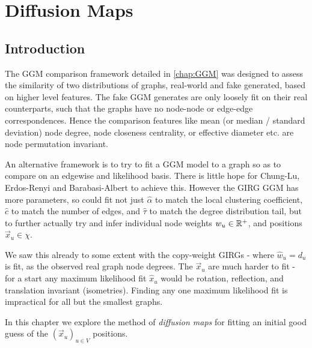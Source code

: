 \chapter{Diffusion Maps}
\label{chap:diff_maps}
\minitoc
\section{Introduction}

The GGM comparison framework detailed in \cref{chap:GGM} was designed to assess the similarity of two distributions of graphs, real-world and fake generated, based on higher level features. The fake GGM generates are only loosely fit on their real counterparts, such that the graphs have no node-node or edge-edge correspondences. Hence the comparison features like mean (or median / standard deviation) node degree, node closeness centrality, or effective diameter etc. are node permutation invariant.

An alternative framework is to try to fit a GGM model to a graph so as to compare on an edgewise and likelihood basis. There is little hope for Chung-Lu, Erdos-Renyi and Barabasi-Albert to achieve this. However the GIRG GGM has more parameters, so could fit not just $\hat{\alpha}$ to match the local clustering coefficient, $\hat{c}$ to match the number of edges, and $\hat{\tau}$ to match the degree distribution tail, but to further actually try and infer individual node weights $w_u \in \mathbb{R}^+$, and positions $\vec{x}_u \in \chi$. 

We saw this already to some extent with the copy-weight GIRGs - where $\hat{w}_u = d_u$ is fit, as the observed real graph node degrees. The $\vec{x}_u$ are much harder to fit - for a start any maximum likelihood fit $\hat{x}_u$ would be rotation, reflection, and translation invariant (isometries). Finding any one maximum likelihood fit is impractical for all but the smallest graphs.

In this chapter we explore the method of \textit{diffusion maps} for fitting an initial good guess of the $(\vec{x}_u)_{u \in V}$ positions.

